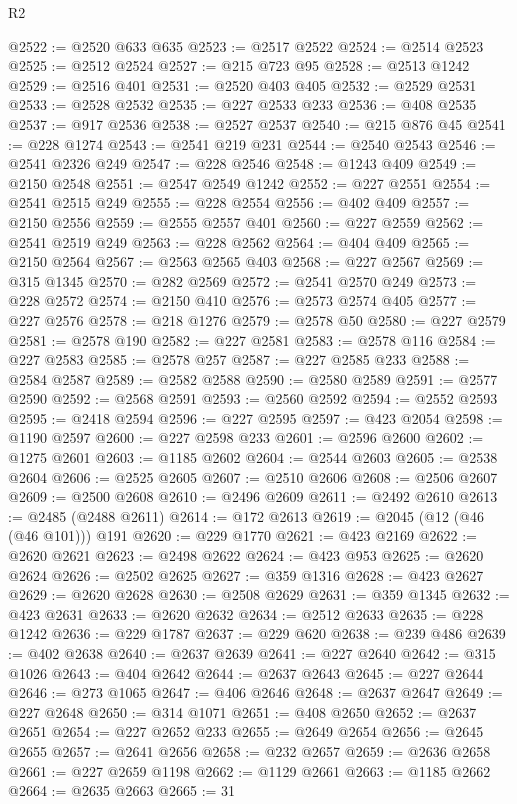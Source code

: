 \begin{lexlean}{R2}
\begin{coremodule}
@2522 := @2520 @633 @635
@2523 := @2517 @2522
@2524 := @2514 @2523
@2525 := @2512 @2524
@2527 := @215 @723 @95
@2528 := @2513 @1242
@2529 := @2516 @401
@2531 := @2520 @403 @405
@2532 := @2529 @2531
@2533 := @2528 @2532
@2535 := @227 @2533 @233
@2536 := @408 @2535
@2537 := @917 @2536
@2538 := @2527 @2537
@2540 := @215 @876 @45
@2541 := @228 @1274
@2543 := @2541 @219 @231
@2544 := @2540 @2543
@2546 := @2541 @2326 @249
@2547 := @228 @2546
@2548 := @1243 @409
@2549 := @2150 @2548
@2551 := @2547 @2549 @1242
@2552 := @227 @2551
@2554 := @2541 @2515 @249
@2555 := @228 @2554
@2556 := @402 @409
@2557 := @2150 @2556
@2559 := @2555 @2557 @401
@2560 := @227 @2559
@2562 := @2541 @2519 @249
@2563 := @228 @2562
@2564 := @404 @409
@2565 := @2150 @2564
@2567 := @2563 @2565 @403
@2568 := @227 @2567
@2569 := @315 @1345
@2570 := @282 @2569
@2572 := @2541 @2570 @249
@2573 := @228 @2572
@2574 := @2150 @410
@2576 := @2573 @2574 @405
@2577 := @227 @2576
@2578 := @218 @1276
@2579 := @2578 @50
@2580 := @227 @2579
@2581 := @2578 @190
@2582 := @227 @2581
@2583 := @2578 @116
@2584 := @227 @2583
@2585 := @2578 @257
@2587 := @227 @2585 @233
@2588 := @2584 @2587
@2589 := @2582 @2588
@2590 := @2580 @2589
@2591 := @2577 @2590
@2592 := @2568 @2591
@2593 := @2560 @2592
@2594 := @2552 @2593
@2595 := @2418 @2594
@2596 := @227 @2595
@2597 := @423 @2054
@2598 := @1190 @2597
@2600 := @227 @2598 @233
@2601 := @2596 @2600
@2602 := @1275 @2601
@2603 := @1185 @2602
@2604 := @2544 @2603
@2605 := @2538 @2604
@2606 := @2525 @2605
@2607 := @2510 @2606
@2608 := @2506 @2607
@2609 := @2500 @2608
@2610 := @2496 @2609
@2611 := @2492 @2610
@2613 := @2485 (@2488 @2611)
@2614 := @172 @2613
@2619 := @2045 (@12 (@46 (@46 @101))) @191
@2620 := @229 @1770
@2621 := @423 @2169
@2622 := @2620 @2621
@2623 := @2498 @2622
@2624 := @423 @953
@2625 := @2620 @2624
@2626 := @2502 @2625
@2627 := @359 @1316
@2628 := @423 @2627
@2629 := @2620 @2628
@2630 := @2508 @2629
@2631 := @359 @1345
@2632 := @423 @2631
@2633 := @2620 @2632
@2634 := @2512 @2633
@2635 := @228 @1242
@2636 := @229 @1787
@2637 := @229 @620
@2638 := @239 @486
@2639 := @402 @2638
@2640 := @2637 @2639
@2641 := @227 @2640
@2642 := @315 @1026
@2643 := @404 @2642
@2644 := @2637 @2643
@2645 := @227 @2644
@2646 := @273 @1065
@2647 := @406 @2646
@2648 := @2637 @2647
@2649 := @227 @2648
@2650 := @314 @1071
@2651 := @408 @2650
@2652 := @2637 @2651
@2654 := @227 @2652 @233
@2655 := @2649 @2654
@2656 := @2645 @2655
@2657 := @2641 @2656
@2658 := @232 @2657
@2659 := @2636 @2658
@2661 := @227 @2659 @1198
@2662 := @1129 @2661
@2663 := @1185 @2662
@2664 := @2635 @2663
@2665 := 31

\end{coremodule}
\end{lexlean}
